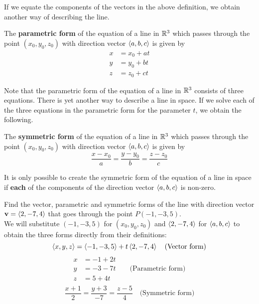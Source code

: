 \documentclass[handout]{ximera}
\begin{document}
If we equate the components of the vectors in the above definition, we obtain another way of describing the line.

\begin{definition}
The \textbf{parametric form} of the equation of a line in $\mathbb R^3$ which passes through the point $(x_0, y_0, z_0)$ with 
direction vector $\left\langle a, b, c\right\rangle$ is given by
\begin{align*}
x &= x_0 + at\\
y &= y_0 + bt\\
z &= z_0 + ct
\end{align*}
\end{definition}
Note that the parametric form of the equation of a line in $\mathbb R^3$ consists of three equations.
There is yet another way to describe a line in space. If we solve each of the three equations in the parametric form for the parameter $t$, 
we obtain the following.
\begin{definition}
The \textbf{symmetric form} of the equation of a line in $\mathbb R^3$ which passes through the point $(x_0, y_0, z_0)$ with 
direction vector $\left\langle a, b, c\right\rangle$ is given by
\[
\frac{x-x_0}{a} = \frac{y-y_0}{b} = \frac{z-z_0}{c}
\]
\end{definition}
\begin{remark}
It is only possible to create the symmetric form of the equation of a line in space if \textbf{each} of the components of 
the direction vector $\left\langle a, b, c\right\rangle$ is non-zero.
\end{remark}


\begin{example}[Example 1]
Find the vector, parametric and symmetric forms of the line with direction 
vector $\mathbf{v} = \left\langle 2, -7, 4\right\rangle$ that goes through the point $P(-1, -3, 5)$. \\
We will substitute $(-1, -3, 5)$ for $(x_0, y_0, z_0)$ and $\left\langle 2, -7, 4\right\rangle$ for $\left\langle a,b,c\right\rangle$ to  
obtain the three forms directly from their definitions:
\[
\left\langle x, y, z\right\rangle = \left\langle -1, -3, 5\right\rangle + t\left\langle 2, -7, 4\right\rangle \quad \text{(Vector form)}
\]
\begin{align*}
x &= -1 +2t\\
y &= -3 -7t \quad\quad \text{(Parametric form)}\\
z &= 5 + 4t\\
\end{align*}
\[
\frac{x+1}{2} = \frac{y+3}{-7} = \frac{z-5}{4} \quad \text{(Symmetric form)}
\]
\end{example}
\end{document}
